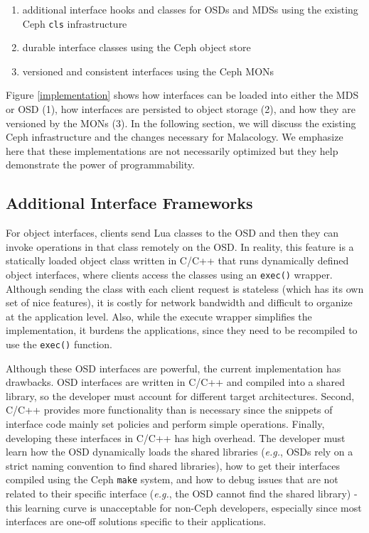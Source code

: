 \documentclass[10pt,twocolumn]{article}
\begin{document}
\iffalse
\begin{enumerate}
\def\labelenumi{\arabic{enumi}.}
\item
  additional interface hooks and classes for OSDs and MDSs using the
  existing Ceph \texttt{cls} infrastructure
\item
  durable interface classes using the Ceph object store
\item
  versioned and consistent interfaces using the Ceph MONs
\end{enumerate}

Figure \ref{implementation} shows how interfaces can be loaded into
either the MDS or OSD (1), how interfaces are persisted to object
storage (2), and how they are versioned by the MONs (3). In the
following section, we will discuss the existing Ceph infrastructure and
the changes necessary for Malacology. We emphasize here that these
implementations are not necessarily optimized but they help demonstrate
the power of programmability.

\subsection{Additional Interface
Frameworks}\label{additional-interface-frameworks}

For object interfaces, clients send Lua classes to the OSD and then they
can invoke operations in that class remotely on the OSD. In reality,
this feature is a statically loaded object class written in C/C++ that
runs dynamically defined object interfaces, where clients access the
classes using an \texttt{exec()} wrapper. Although sending the class
with each client request is stateless (which has its own set of nice
features), it is costly for network bandwidth and difficult to organize
at the application level. Also, while the execute wrapper simplifies the
implementation, it burdens the applications, since they need to be
recompiled to use the \texttt{exec()} function.

Although these OSD interfaces are powerful, the current implementation
has drawbacks. OSD interfaces are written in C/C++ and compiled into a
shared library, so the developer must account for different target
architectures. Second, C/C++ provides more functionality than is
necessary since the snippets of interface code mainly set policies and
perform simple operations. Finally, developing these interfaces in C/C++
has high overhead. The developer must learn how the OSD dynamically
loads the shared libraries (\emph{e.g.}, OSDs rely on a strict naming
convention to find shared libraries), how to get their interfaces
compiled using the Ceph \texttt{make} system, and how to debug issues
that are not related to their specific interface (\emph{e.g.}, the OSD
cannot find the shared library) - this learning curve is unacceptable
for non-Ceph developers, especially since most interfaces are one-off
solutions specific to their applications.
\end{document}
